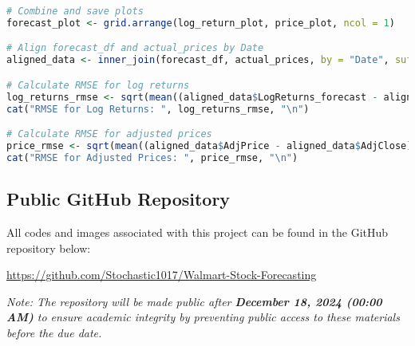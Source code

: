 \documentclass{article}
\newcommand{\1}{\mathbbm{1}}
\theoremstyle{definition}
\begin{document}
\begin{lstlisting}[language=R]
# Combine and save plots
forecast_plot <- grid.arrange(log_return_plot, price_plot, ncol = 1)

# Align forecast_df and actual_prices by Date
aligned_data <- inner_join(forecast_df, actual_prices, by = "Date", suffix = c("_forecast", "_actual"))

# Calculate RMSE for log returns
log_returns_rmse <- sqrt(mean((aligned_data$LogReturns_forecast - aligned_data$LogReturns_actual)^2, na.rm = TRUE))
cat("RMSE for Log Returns: ", log_returns_rmse, "\n")

# Calculate RMSE for adjusted prices
price_rmse <- sqrt(mean((aligned_data$AdjPrice - aligned_data$AdjClose)^2, na.rm = TRUE))
cat("RMSE for Adjusted Prices: ", price_rmse, "\n")
\end{lstlisting}


\newpage
\subsection{Public GitHub Repository}
All codes and images associated with this project can be found in the GitHub repository below:

\begin{center}
\url{https://github.com/Stochastic1017/Walmart-Stock-Forecasting}
\end{center}

\textit{Note: The repository will be made public after \textbf{December 18, 2024 (00:00 AM)} to ensure academic integrity by preventing public access to these materials before the due date.}\\
\end{document}
